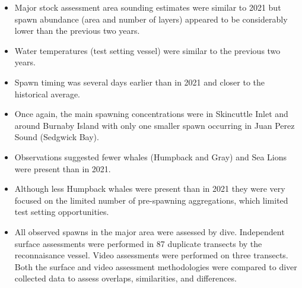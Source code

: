 \begin{itemize}

\item Major stock assessment area sounding estimates
were similar to 2021 but spawn abundance (area and number of layers)
appeared to be considerably lower than the previous two years.

\item Water temperatures (test setting vessel) were similar to the previous two years.

\item Spawn timing was several days earlier than in 2021
and closer to the historical average.

\item Once again, the main spawning concentrations were in Skincuttle Inlet
and around Burnaby Island with only one smaller spawn
occurring in Juan Perez Sound (Sedgwick Bay).

\item Observations suggested fewer whales (Humpback and Gray)
and Sea Lions were present than in 2021.

\item Although less Humpback whales were present than in 2021
they were very focused on the limited number of pre-spawning aggregations,
which limited test setting opportunities.

\item All observed spawns in the major area were assessed by dive.
Independent surface assessments were performed in 87
duplicate transects by the reconnaisance vessel.
Video assessments were performed on three transects.
Both the surface and video assessment methodologies were compared
to diver collected data to assess overlaps, similarities, and differences.

\end{itemize}